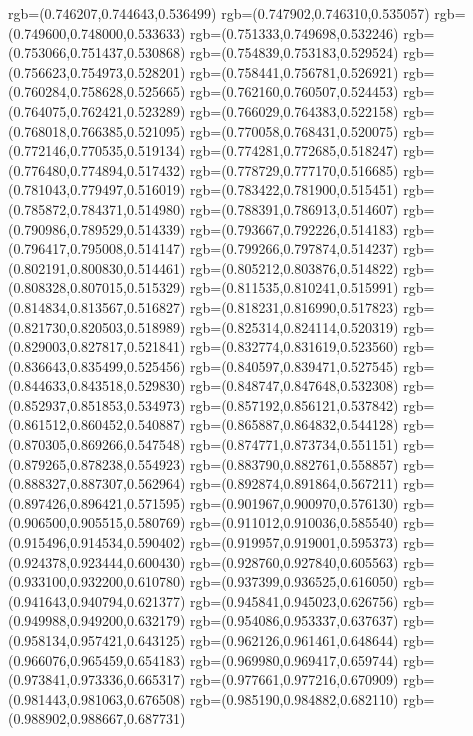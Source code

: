 {{{			rgb=(0.746207,0.744643,0.536499)
			rgb=(0.747902,0.746310,0.535057)
			rgb=(0.749600,0.748000,0.533633)
			rgb=(0.751333,0.749698,0.532246)
			rgb=(0.753066,0.751437,0.530868)
			rgb=(0.754839,0.753183,0.529524)
			rgb=(0.756623,0.754973,0.528201)
			rgb=(0.758441,0.756781,0.526921)
			rgb=(0.760284,0.758628,0.525665)
			rgb=(0.762160,0.760507,0.524453)
			rgb=(0.764075,0.762421,0.523289)
			rgb=(0.766029,0.764383,0.522158)
			rgb=(0.768018,0.766385,0.521095)
			rgb=(0.770058,0.768431,0.520075)
			rgb=(0.772146,0.770535,0.519134)
			rgb=(0.774281,0.772685,0.518247)
			rgb=(0.776480,0.774894,0.517432)
			rgb=(0.778729,0.777170,0.516685)
			rgb=(0.781043,0.779497,0.516019)
			rgb=(0.783422,0.781900,0.515451)
			rgb=(0.785872,0.784371,0.514980)
			rgb=(0.788391,0.786913,0.514607)
			rgb=(0.790986,0.789529,0.514339)
			rgb=(0.793667,0.792226,0.514183)
			rgb=(0.796417,0.795008,0.514147)
			rgb=(0.799266,0.797874,0.514237)
			rgb=(0.802191,0.800830,0.514461)
			rgb=(0.805212,0.803876,0.514822)
			rgb=(0.808328,0.807015,0.515329)
			rgb=(0.811535,0.810241,0.515991)
			rgb=(0.814834,0.813567,0.516827)
			rgb=(0.818231,0.816990,0.517823)
			rgb=(0.821730,0.820503,0.518989)
			rgb=(0.825314,0.824114,0.520319)
			rgb=(0.829003,0.827817,0.521841)
			rgb=(0.832774,0.831619,0.523560)
			rgb=(0.836643,0.835499,0.525456)
			rgb=(0.840597,0.839471,0.527545)
			rgb=(0.844633,0.843518,0.529830)
			rgb=(0.848747,0.847648,0.532308)
			rgb=(0.852937,0.851853,0.534973)
			rgb=(0.857192,0.856121,0.537842)
			rgb=(0.861512,0.860452,0.540887)
			rgb=(0.865887,0.864832,0.544128)
			rgb=(0.870305,0.869266,0.547548)
			rgb=(0.874771,0.873734,0.551151)
			rgb=(0.879265,0.878238,0.554923)
			rgb=(0.883790,0.882761,0.558857)
			rgb=(0.888327,0.887307,0.562964)
			rgb=(0.892874,0.891864,0.567211)
			rgb=(0.897426,0.896421,0.571595)
			rgb=(0.901967,0.900970,0.576130)
			rgb=(0.906500,0.905515,0.580769)
			rgb=(0.911012,0.910036,0.585540)
			rgb=(0.915496,0.914534,0.590402)
			rgb=(0.919957,0.919001,0.595373)
			rgb=(0.924378,0.923444,0.600430)
			rgb=(0.928760,0.927840,0.605563)
			rgb=(0.933100,0.932200,0.610780)
			rgb=(0.937399,0.936525,0.616050)
			rgb=(0.941643,0.940794,0.621377)
			rgb=(0.945841,0.945023,0.626756)
			rgb=(0.949988,0.949200,0.632179)
			rgb=(0.954086,0.953337,0.637637)
			rgb=(0.958134,0.957421,0.643125)
			rgb=(0.962126,0.961461,0.648644)
			rgb=(0.966076,0.965459,0.654183)
			rgb=(0.969980,0.969417,0.659744)
			rgb=(0.973841,0.973336,0.665317)
			rgb=(0.977661,0.977216,0.670909)
			rgb=(0.981443,0.981063,0.676508)
			rgb=(0.985190,0.984882,0.682110)
			rgb=(0.988902,0.988667,0.687731)
}}}
